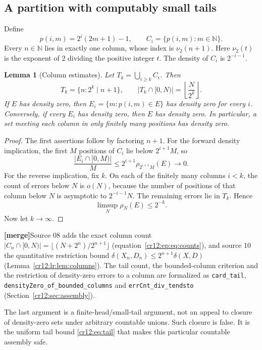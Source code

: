 \documentclass[11pt,letterpaper]{article}
\theoremstyle{plain}
\newtheorem{lemma}[theorem]{Lemma}
\theoremstyle{definition}
\theoremstyle{remark}
\numberwithin{equation}{section}
\newcommand{\N}{\mathbb N}
\newcommand{\mergenote}[1]{\par\smallskip\noindent
 {\small\textsf{\textbf{[merge]}}\enspace #1}\par\smallskip}
\begin{document}
\subsection{A partition with computably small tails}
Define
\begin{equation}\label{cr12:eq:pairing}
 p(i,m)=2^i(2m+1)-1,
 \qquad C_i=\{p(i,m):m\in\N\}.
\end{equation}
Every $n\in\N$ lies in exactly one column, whose index is $\nu_2(n+1)$.
Here $\nu_2(t)$ is the exponent of $2$ dividing the positive integer $t$.
The density of $C_i$ is $2^{-i-1}$.

\begin{lemma}[Column estimates]\label{cr12:lem:columns}
Let $T_k=\bigcup_{i\ge k}C_i$. Then
\begin{equation}\label{cr12:eq:tail}
 T_k=\{n:2^k\mid n+1\},\qquad
 |T_k\cap[0,N)|=\left\lfloor\frac{N}{2^k}\right\rfloor.
\end{equation}
If $E$ has density zero, then
$E_i=\{m:p(i,m)\in E\}$ has density zero for every $i$.
Conversely, if every $E_i$ has density zero, then $E$ has density zero.
In particular, a set meeting each column in only finitely many positions has
density zero.
\end{lemma}
\begin{proof}
The first assertions follow by factoring $n+1$. For the forward density
implication, the first $M$ positions of $C_i$ lie below $2^{i+1}M$, so
\[
 \frac{|E_i\cap[0,M)|}{M}
 \le 2^{i+1}\rho_{2^{i+1}M}(E)\longrightarrow0.
\]
For the reverse implication, fix $k$. On each of the finitely many columns
$i<k$, the count of errors below $N$ is $o(N)$, because the number of positions
of that column below $N$ is asymptotic to $2^{-i-1}N$. The remaining errors lie
in $T_k$. Hence
\[
 \limsup_N\rho_N(E)\le2^{-k}.
\]
Now let $k\to\infty$.
\end{proof}
\mergenote{Source 08 adds the exact column count
$|C_n\cap[0,N)|=\lfloor(N+2^n)/2^{n+1}\rfloor$ (equation~\eqref{cr12:ep:eq:counts}),
and source 10 the quantitative restriction bound
$\delta(X_n,D_n)\le2^{n+1}\delta(X,D)$ (Lemma~\ref{cr12:lr:lem:columns}). The tail
count, the bounded-column criterion and the restriction of density-zero errors to a
column are formalized as \texttt{card\_tail}, \texttt{densityZero\_of\_bounded\_columns}
and \texttt{errCnt\_div\_tendsto} (Section~\ref{cr12:sec:assembly}).}

The last argument is a finite-head/small-tail argument, not an appeal to closure
of density-zero sets under arbitrary countable unions. Such closure is false.
It is the uniform tail bound \eqref{cr12:eq:tail} that makes this particular
countable assembly safe.
\end{document}
